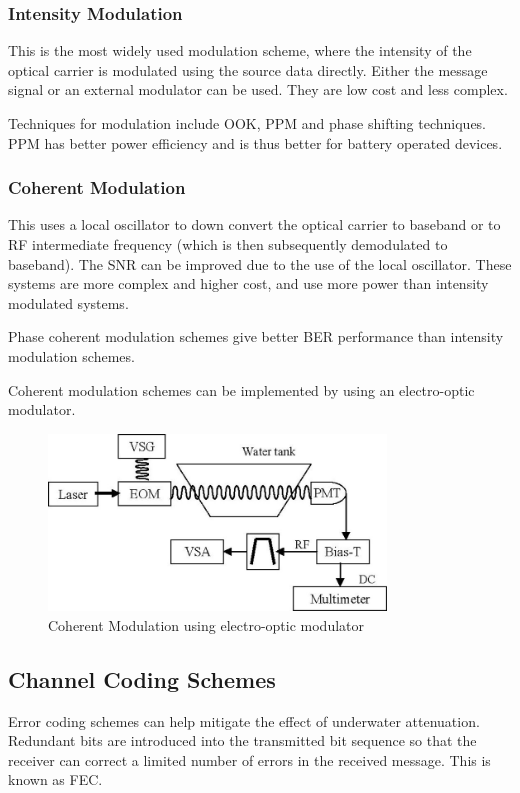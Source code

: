 \documentclass{article}
\begin{document}
\subsubsection{Intensity Modulation}
This is the most widely used modulation scheme, where the intensity of the optical carrier is modulated using the source data directly. Either the message signal or an external modulator can be used. They are low cost and less complex.

Techniques for modulation include \ac{OOK}, \ac{PPM} and phase shifting techniques. \ac{PPM} has better power efficiency and is thus better for battery operated devices.

\subsubsection{Coherent Modulation}
This uses a local oscillator to down convert the optical carrier to baseband or to \ac{RF} intermediate frequency (which is then subsequently demodulated to baseband). The \ac{SNR} can be improved due to the use of the local oscillator. These systems are more complex and higher cost, and use more power than intensity modulated systems.

Phase coherent modulation schemes give better \ac{BER} performance than intensity modulation schemes.

Coherent modulation schemes can be implemented by using an electro-optic modulator.

\begin{figure}[H]
  \includegraphics[width=0.8\textwidth]{coherent-source.jpg}
  \caption{Coherent Modulation using electro-optic modulator  \cite{cochenour_mullen_laux_2007}}
  \label{fig:boat1}
\end{figure}

\subsection{Channel Coding Schemes}
Error coding schemes can help mitigate the effect of underwater attenuation. Redundant bits are introduced into the transmitted bit sequence so that the receiver can correct a limited number of errors in the received message. This is known as \ac{FEC}.
\end{document}
